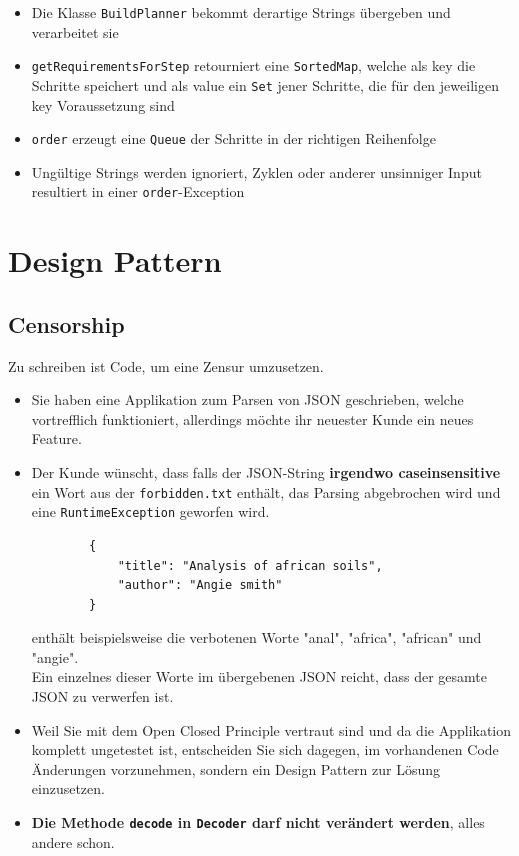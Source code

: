 \begin{itemize}
	\item Die Klasse \texttt{BuildPlanner} bekommt derartige Strings übergeben und verarbeitet sie
	\item \texttt{getRequirementsForStep} retourniert eine \texttt{SortedMap}, welche als key die Schritte speichert und als value ein \texttt{Set} jener Schritte, die für den jeweiligen key Voraussetzung sind
	\item \texttt{order} erzeugt eine \texttt{Queue} der Schritte in der richtigen Reihenfolge
	\item Ungültige Strings werden ignoriert, Zyklen oder anderer unsinniger Input resultiert in einer \texttt{order}-Exception
\end{itemize}

\section{Design Pattern}
\subsection{Censorship}
Zu schreiben ist Code, um eine Zensur umzusetzen.

\begin{itemize}
	\item Sie haben eine Applikation zum Parsen von JSON geschrieben, welche vortrefflich funktioniert, allerdings möchte ihr neuester Kunde ein neues Feature. 
	\item Der Kunde wünscht, dass falls der JSON-String \textbf{irgendwo caseinsensitive} ein Wort aus der \texttt{forbidden.txt} enthält, das Parsing abgebrochen wird und eine \texttt{RuntimeException} geworfen wird. \\
	\begin{verbatim}
		{
			"title": "Analysis of african soils",
			"author": "Angie smith"
		}
	\end{verbatim}
	enthält beispielsweise die verbotenen Worte "anal", "africa", "african" und "angie". \\
	Ein einzelnes dieser Worte im übergebenen JSON reicht, dass der gesamte JSON zu verwerfen ist. 
	\item Weil Sie mit dem Open Closed Principle vertraut sind und da die Applikation komplett ungetestet ist, entscheiden Sie sich dagegen, im vorhandenen Code Änderungen vorzunehmen, sondern ein Design Pattern zur Lösung einzusetzen.
	\item \textbf{Die Methode \texttt{decode} in \texttt{Decoder} darf nicht verändert werden}, alles andere schon. 
\end{itemize}

